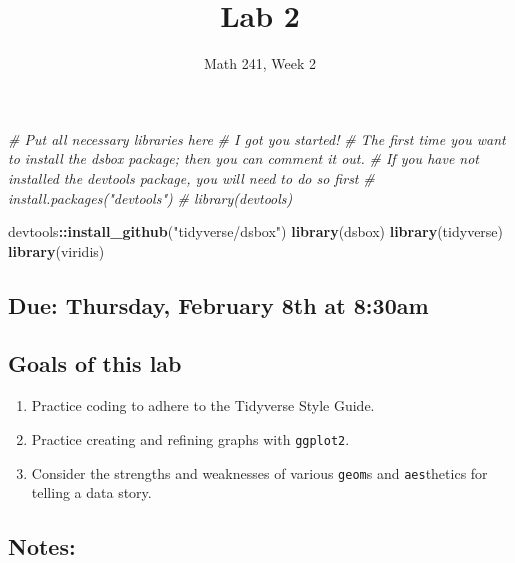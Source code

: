 \documentclass[
]{article}
\title{Lab 2}
\author{}
\date{\vspace{-2.5em}Math 241, Week 2}
\newenvironment{Shaded}{\begin{snugshade}}{\end{snugshade}}
\newcommand{\CommentTok}[1]{\textcolor[rgb]{0.56,0.35,0.01}{\textit{#1}}}
\newcommand{\FunctionTok}[1]{\textcolor[rgb]{0.13,0.29,0.53}{\textbf{#1}}}
\newcommand{\NormalTok}[1]{#1}
\newcommand{\SpecialCharTok}[1]{\textcolor[rgb]{0.81,0.36,0.00}{\textbf{#1}}}
\newcommand{\StringTok}[1]{\textcolor[rgb]{0.31,0.60,0.02}{#1}}
\providecommand{\tightlist}{%
  \setlength{\itemsep}{0pt}\setlength{\parskip}{0pt}}
\begin{document}
\maketitle

\begin{Shaded}
\begin{Highlighting}[]
\CommentTok{\# Put all necessary libraries here}
\CommentTok{\# I got you started!}
\CommentTok{\# The first time you want to install the dsbox package; then you can comment it out.}
\CommentTok{\# If you have not installed the devtools package, you will need to do so first}
\CommentTok{\# install.packages("devtools")}
\CommentTok{\# library(devtools)}

\NormalTok{devtools}\SpecialCharTok{::}\FunctionTok{install\_github}\NormalTok{(}\StringTok{"tidyverse/dsbox"}\NormalTok{)}
\FunctionTok{library}\NormalTok{(dsbox)}
\FunctionTok{library}\NormalTok{(tidyverse)}
\FunctionTok{library}\NormalTok{(viridis)}
\end{Highlighting}
\end{Shaded}

\hypertarget{due-thursday-february-8th-at-830am}{%
\subsection{Due: Thursday, February 8th at
8:30am}\label{due-thursday-february-8th-at-830am}}

\hypertarget{goals-of-this-lab}{%
\subsection{Goals of this lab}\label{goals-of-this-lab}}

\begin{enumerate}
\def\labelenumi{\arabic{enumi}.}
\tightlist
\item
  Practice coding to adhere to the Tidyverse Style Guide.
\item
  Practice creating and refining graphs with \texttt{ggplot2}.
\item
  Consider the strengths and weaknesses of various \texttt{geom}s and
  \texttt{aes}thetics for telling a data story.
\end{enumerate}

\hypertarget{notes}{%
\subsection{Notes:}\label{notes}}
\end{document}
